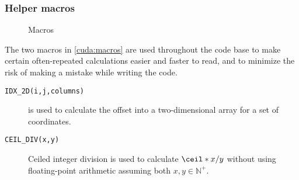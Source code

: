 \subsubsection{Helper macros}
\begin{figure}[H]
    \centering
    \caption{Macros}
    \label{cuda:macros}
\end{figure}

The two macros in \autoref{cuda:macros} are used throughout the code base to
make certain often-repeated calculations easier and faster to read, and to
minimize the risk of making a mistake while writing the code.

\begin{description}

    \item[\texttt{IDX\_2D(i,j,columns)}] is used to calculate the
        offset into a two-dimensional array for a set of coordinates.

    \item[\texttt{CEIL\_DIV(x,y)}] Ceiled integer division is used to calculate
        \(\ceil*{x/y}\) without using floating-point arithmetic assuming both
        \(x, y \in \mathbb{N}^{+} \).

\end{description}

